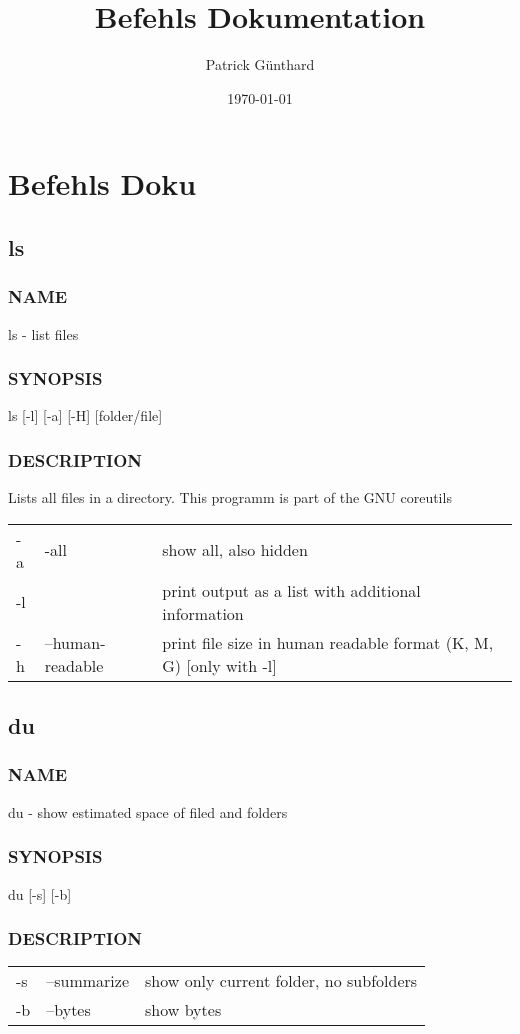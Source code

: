 \documentclass[11pt]{book}
\author{Patrick Günthard}
\date{\today}
\title{Befehls Dokumentation}
\begin{document}
\maketitle
\tableofcontents

\part{Befehls Doku}
\label{sec-1}

\chapter{ls}
\label{sec-1-1}
\section{NAME}
\label{sec-1-1-1}
ls - list files
\section{SYNOPSIS}
\label{sec-1-1-2}
ls [-l] [-a] [-H] [folder/file]
\section{DESCRIPTION}
\label{sec-1-1-3}
Lists all files in a directory. This programm is part of the GNU coreutils

\begin{center}
\begin{tabular}{lll}
-a & -all & show all, also hidden\\
-l &  & print output as a list with additional information\\
-h & --human-readable & print file size in human readable format (K, M, G) [only with -l]\\
\end{tabular}
\end{center}
\chapter{du}
\label{sec-1-2}
\section{NAME}
\label{sec-1-2-1}
du - show estimated space of filed and folders
\section{SYNOPSIS}
\label{sec-1-2-2}
du [-s] [-b]
\section{DESCRIPTION}
\label{sec-1-2-3}
\begin{center}
\begin{tabular}{lll}
-s & --summarize & show only current folder, no subfolders\\
-b & --bytes & show bytes\\
\end{tabular}
\end{center}
\end{document}
